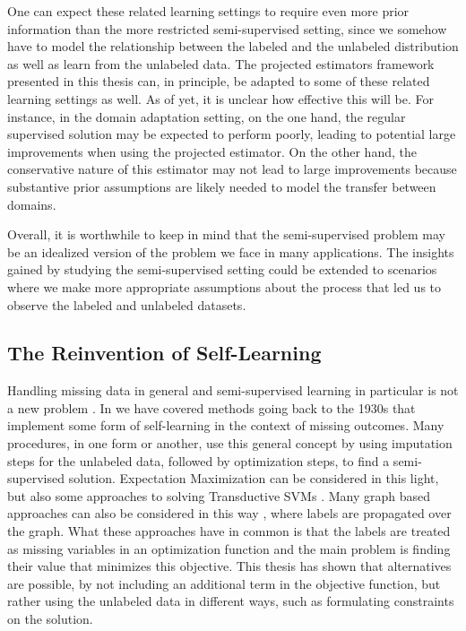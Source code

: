 \documentclass[twoside]{memoir}\usepackage[]{graphicx}\usepackage{xcolor}
\renewcommand{\cite}{\citep}
\begin{document}
One can expect these related learning settings to require even more prior information than the more restricted semi-supervised setting, since we somehow have to model the relationship between the labeled and the unlabeled distribution as well as learn from the unlabeled data. The projected estimators framework presented in this thesis can, in principle, be adapted to some of these related learning settings as well. As of yet, it is unclear how effective this will be. For instance, in the domain adaptation setting, on the one hand, the regular supervised solution may be expected to perform poorly, leading to potential large improvements when using the projected estimator. On the other hand, the conservative nature of this estimator may not lead to large improvements because substantive prior assumptions are likely needed to model the transfer between domains.

Overall, it is worthwhile to keep in mind that the semi-supervised problem may be an idealized version of the problem we face in many applications. The insights gained by studying the semi-supervised setting could be extended to scenarios where we make more appropriate assumptions about the process that led us to observe the labeled and unlabeled datasets.

\subsection{The Reinvention of Self-Learning}
Handling missing data in general and semi-supervised learning in particular is not a new problem \citep{Little2002}. In  we have covered methods going back to the 1930s that implement some form of self-learning in the context of missing outcomes. Many procedures, in one form or another, use this general concept by using imputation steps for the unlabeled data, followed by optimization steps, to find a semi-supervised solution. Expectation Maximization \cite{Dempster1977} can be considered in this light, but also some approaches to solving Transductive SVMs \citep{Joachims1999}. Many graph based approaches can also be considered in this way \citep{Zhu2003}, where labels are propagated over the graph. What these approaches have in common is that the labels are treated as missing variables in an optimization function and the main problem is finding their value that minimizes this objective. This thesis has shown that alternatives are possible, by not including an additional term in the objective function, but rather using the unlabeled data in different ways, such as formulating constraints on the solution.
\end{document}
